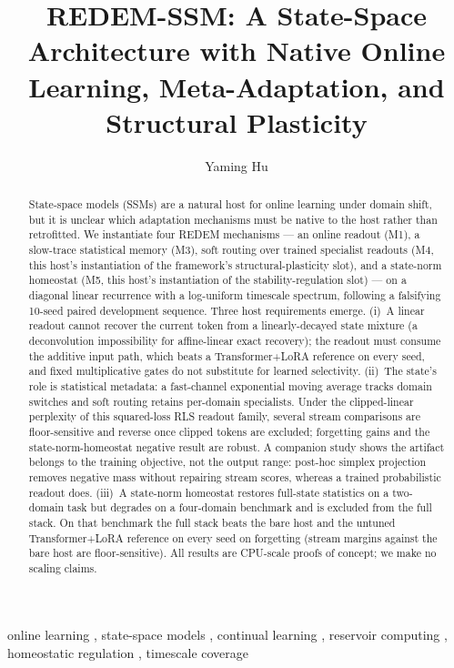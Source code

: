 \documentclass[preprint,12pt]{elsarticle}
\begin{document}
\begin{frontmatter}

\title{REDEM-SSM: A State-Space Architecture with Native Online
Learning, Meta-Adaptation, and Structural Plasticity}

\author[a]{Yaming Hu}
\address[a]{Independent Researcher, Guiyang, Guizhou, China}

\begin{abstract}
State-space models (SSMs) are a natural host for online learning under
domain shift, but it is unclear which adaptation mechanisms must be
native to the host rather than retrofitted. We instantiate four
REDEM mechanisms --- an online readout (M1), a slow-trace statistical
memory (M3), soft routing over trained specialist readouts (M4, this
host's instantiation of the framework's structural-plasticity slot),
and a state-norm homeostat (M5, this host's instantiation of the
stability-regulation slot) --- on a diagonal linear recurrence with a
log-uniform timescale
spectrum, following a falsifying 10-seed paired development sequence.
Three host requirements emerge. (i)~A linear readout cannot recover
the current token from a linearly-decayed state mixture (a
deconvolution impossibility for affine-linear exact recovery); the
readout must consume the additive
input path, which beats a Transformer+LoRA reference on every seed,
and fixed multiplicative gates do not substitute for learned
selectivity. (ii)~The state's role is statistical metadata: a
fast-channel exponential moving average tracks domain switches and
soft routing retains per-domain specialists. Under the clipped-linear
perplexity of this squared-loss RLS readout family, several stream
comparisons are floor-sensitive and reverse once clipped tokens are
excluded; forgetting gains and the state-norm-homeostat negative
result are robust. A
companion study shows the artifact belongs to the training objective,
not the output range: post-hoc simplex projection removes negative
mass without repairing stream scores, whereas a trained probabilistic
readout does. (iii)~A
state-norm homeostat restores full-state statistics on a two-domain
task but degrades on a four-domain benchmark and is excluded from the
full stack. On that benchmark the full stack beats the bare host and
the untuned Transformer+LoRA reference on every seed on forgetting
(stream margins against the bare host are floor-sensitive). All
results are CPU-scale proofs of concept; we make no scaling claims.
\end{abstract}

\begin{keyword}
online learning \sep
state-space models \sep
continual learning \sep
reservoir computing \sep
homeostatic regulation \sep
timescale coverage
\end{keyword}

\end{frontmatter}
\end{document}
